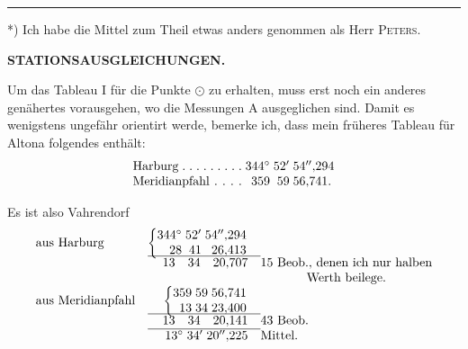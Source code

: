 \par\smallskip\noindent\rule{4cm}{.4pt}\par
{\footnotesize\noindent\hspace*{\parindent}*) Ich habe die Mittel zum Theil etwas anders genommen als Herr \textsc{Peters}.\par}

\par\clearpage
\noindent\null\hfill{\small\textbf{STATIONSAUSGLEICHUNGEN.}}\hfill{}\par\medskip

Um das Tableau I für die Punkte \(\odot\) zu erhalten, muss erst noch ein anderes genähertes vorausgehen, wo die Messungen A  ausgeglichen sind. Damit es wenigstens ungefähr orientirt werde, bemerke ich, dass mein früheres Tableau für Altona folgendes enthält:
\[
\begin{array}{@{}l@{\;}r@{\;}r@{\;}l@{}}
 \text{\hbox to 8.7em{Harburg\hfil.\hfil.\hfil.\hfil.\hfil.\hfil.\hfil.\hfil.\hfil.}}&344^\circ&52'&54''{,}294\\
 \text{\hbox to 8.7em{Meridianpfahl\hfil.\hfil.\hfil.\hfil.}}&359&59&56{,}741.
\end{array}
\]

Es ist also Vahrendorf
\[
\begin{array}{@{}l@{\quad}r@{\quad}l@{}}
 \text{aus Harburg}&
 \left\{\begin{array}{@{}r@{\;}r@{\;}r@{}}344^\circ&52'&54''{,}294\\28&41&26{,}413\end{array}\right.&\\[-2pt]
 \cline{2-2}
 &13\quad34\quad20{,}707&
 \begin{array}[t]{@{}c@{}}\text{15 Beob., denen ich nur halben}\\\text{Werth beilege.}\end{array}\\[5pt]
 \text{aus Meridianpfahl}&
 \left\{\begin{array}{@{}r@{\;}r@{\;}r@{}}359&59&56{,}741\\13&34&23{,}400\end{array}\right.&\\[-2pt]
 \cline{2-2}
 &13\quad34\quad20{,}141&\text{43 Beob.}\\
 \cline{2-2}
 &13^\circ\;34'\;20''{,}225&\text{Mittel.}
\end{array}
\]

